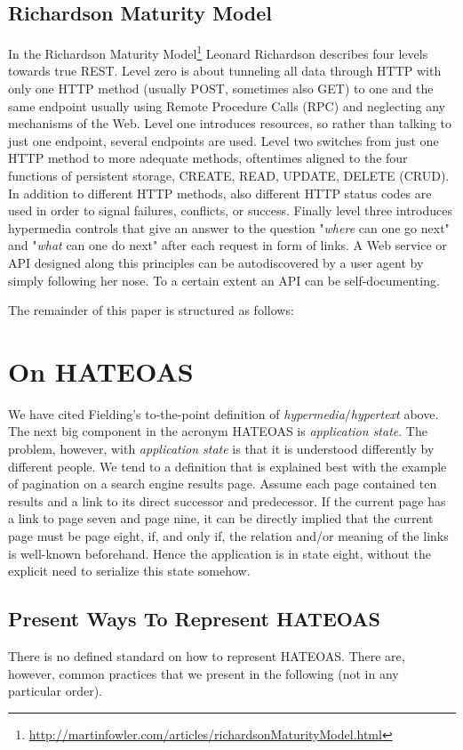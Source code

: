 \documentclass{acm_proc_article-sp}
\begin{document}
\subsection{Richardson Maturity Model}
In the Richardson Maturity Model\footnote{\url{http://martinfowler.com/articles/richardsonMaturityModel.html}} Leonard Richardson describes four levels towards true REST. Level zero is about tunneling all data through HTTP with only one HTTP method (usually POST, sometimes also GET) to one and the same endpoint usually using Remote Procedure Calls (RPC) and neglecting any mechanisms of the Web. Level one introduces resources, so rather than talking to just one endpoint, several endpoints are used. Level two switches from just one HTTP method to more adequate methods, oftentimes aligned to the four functions of persistent storage, CREATE, READ, UPDATE, DELETE (CRUD). In addition to different HTTP methods, also different HTTP status codes are used in order to signal failures, conflicts, or success. Finally level three introduces hypermedia controls that give an answer to the question "\textit{where} can one go next" and "\textit{what} can one do next" after each request in form of links. A Web service or API designed along this principles can be autodiscovered by a user agent by simply following her nose. To a certain extent an API can be self-documenting.

The remainder of this paper is structured as follows: 

\section{On HATEOAS}\label{sec:hateoas}
We have cited Fielding's to-the-point definition of \textit{hypermedia}/\textit{hypertext} above. The next big component in the acronym HATEOAS is \textit{application state}. The problem, however, with \textit{application state} is that it is understood differently by different people. We tend to a definition that is explained best with the example of pagination on a search engine results page. Assume each page contained ten results and a link to its direct successor and predecessor. If the current page has a link to page seven and page nine, it can be directly implied that the current page must be page eight, if, and only if, the relation and/or meaning of the links is well-known beforehand. Hence the application is in state eight, without the explicit need to serialize this state somehow.

\subsection{Present Ways To Represent HATEOAS}\label{sec:currenthateoas}
There is no defined standard on how to represent HATEOAS. There are, however, common practices that we present in the following (not in any particular order).
\end{document}
